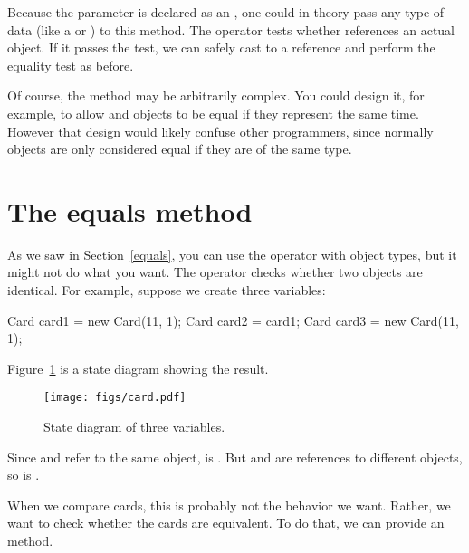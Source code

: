Because the parameter is declared as an , one could in theory pass any type of data (like a  or ) to this method.
The  operator tests whether  references an actual  object.
If it passes the test, we can safely cast  to a  reference and perform the equality test as before.

Of course, the  method may be arbitrarily complex.
You could design it, for example, to allow  and  objects to be equal if they represent the same time.
However that design would likely confuse other programmers, since normally objects are only considered equal if they are of the same type.



\section{The equals method}
\label{equivalence}

As we saw in Section~\ref{equals}, you can use the \java{==} operator with object types, but it might not do what you want.
The \java{==} operator checks whether two objects are identical.
For example, suppose we create three  variables:


\begin{code}
Card card1 = new Card(11, 1);
Card card2 = card1;
Card card3 = new Card(11, 1);
\end{code}

Figure~\ref{fig.card} is a state diagram showing the result.

\begin{figure}[!ht]
\begin{center}
\texttt{[image: figs/card.pdf]}
\caption{State diagram of three  variables.}
\label{fig.card}
\end{center}
\end{figure}

Since  and  refer to the same object,  is .
But  and  are references to different objects, so  is .

When we compare cards, this is probably not the behavior we want.
Rather, we want to check whether the cards are equivalent.
To do that, we can provide an  method.

